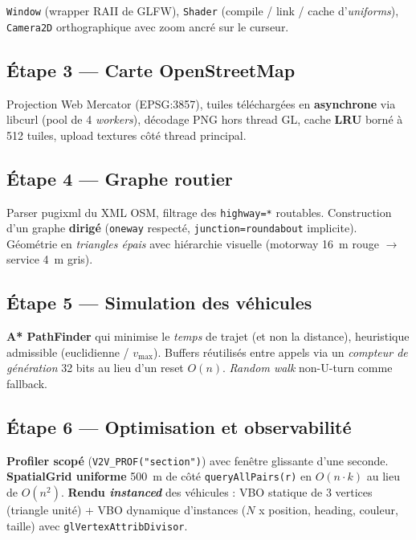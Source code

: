 \documentclass[a4paper,11pt]{article}
\begin{document}
\texttt{Window} (wrapper RAII de GLFW), \texttt{Shader} (compile / link /
cache d'\textit{uniforms}), \texttt{Camera2D} orthographique avec zoom
ancr\'e sur le curseur.

\subsection*{\'Etape 3 — Carte OpenStreetMap}

Projection Web Mercator (EPSG:3857), tuiles t\'el\'echarg\'ees en
\textbf{asynchrone} via libcurl (pool de 4 \emph{workers}), d\'ecodage PNG
hors thread GL, cache \textbf{LRU} born\'e \`a 512 tuiles, upload textures
c\^ot\'e thread principal.

\subsection*{\'Etape 4 — Graphe routier}

Parser pugixml du XML OSM, filtrage des \texttt{highway=*} routables.
Construction d'un graphe \textbf{dirig\'e} (\texttt{oneway} respect\'e,
\texttt{junction=roundabout} implicite). G\'eom\'etrie en
\textit{triangles \'epais} avec hi\'erarchie visuelle (motorway 16~m rouge
$\rightarrow$ service 4~m gris).

\subsection*{\'Etape 5 — Simulation des v\'ehicules}

\textbf{A* PathFinder} qui minimise le \textit{temps} de trajet (et non la
distance), heuristique admissible (euclidienne / $v_{\max}$). Buffers
r\'eutilis\'es entre appels via un \emph{compteur de g\'en\'eration} 32 bits
au lieu d'un reset $O(n)$. \textit{Random walk} non-U-turn comme fallback.

\subsection*{\'Etape 6 — Optimisation et observabilit\'e}

\textbf{Profiler scop\'e} (\texttt{V2V\_PROF("section")}) avec fen\^etre
glissante d'une seconde. \textbf{SpatialGrid uniforme} 500~m de c\^ot\'e \textemdash{}
\texttt{queryAllPairs(r)} en $O(n \cdot k)$ au lieu de $O(n^2)$.
\textbf{Rendu \emph{instanced}} des v\'ehicules : VBO statique de 3 vertices
(triangle unit\'e) + VBO dynamique d'instances ($N$ x position, heading,
couleur, taille) avec \texttt{glVertexAttribDivisor}.
\end{document}

